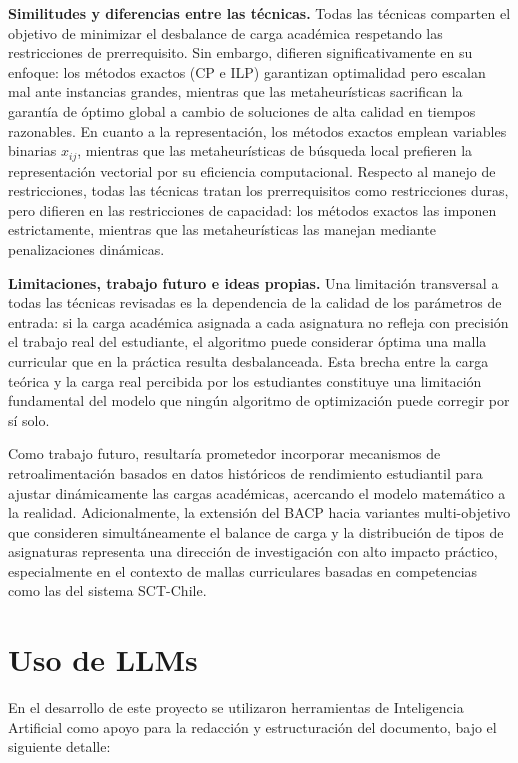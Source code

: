 \documentclass[letter, 10pt]{article}
\begin{document}
\textbf{Similitudes y diferencias entre las t\'ecnicas.} Todas las 
t\'ecnicas comparten el objetivo de minimizar el desbalance de carga 
acad\'emica respetando las restricciones de prerrequisito. Sin 
embargo, difieren significativamente en su enfoque: los m\'etodos 
exactos (CP e ILP) garantizan optimalidad pero escalan mal ante 
instancias grandes, mientras que las metaheur\'isticas sacrifican 
la garant\'ia de \'optimo global a cambio de soluciones de alta 
calidad en tiempos razonables. En cuanto a la representaci\'on, los 
m\'etodos exactos emplean variables binarias $x_{ij}$, mientras que 
las metaheur\'isticas de b\'usqueda local prefieren la representaci\'on 
vectorial por su eficiencia computacional. Respecto al manejo de 
restricciones, todas las t\'ecnicas tratan los prerrequisitos como 
restricciones duras, pero difieren en las restricciones de capacidad: 
los m\'etodos exactos las imponen estrictamente, mientras que las 
metaheur\'isticas las manejan mediante penalizaciones din\'amicas.

\textbf{Limitaciones, trabajo futuro e ideas propias.} Una limitaci\'on 
transversal a todas las t\'ecnicas revisadas es la dependencia de la 
calidad de los par\'ametros de entrada: si la carga acad\'emica 
asignada a cada asignatura no refleja con precisi\'on el trabajo real 
del estudiante, el algoritmo puede considerar \'optima una malla 
curricular que en la pr\'actica resulta desbalanceada. Esta brecha 
entre la carga te\'orica y la carga real percibida por los estudiantes 
constituye una limitaci\'on fundamental del modelo que ning\'un 
algoritmo de optimizaci\'on puede corregir por s\'i solo.

Como trabajo futuro, resultar\'ia prometedor incorporar mecanismos 
de retroalimentaci\'on basados en datos hist\'oricos de rendimiento 
estudiantil para ajustar din\'amicamente las cargas acad\'emicas, 
acercando el modelo matem\'atico a la realidad. Adicionalmente, la 
extensi\'on del BACP hacia variantes multi-objetivo que consideren 
simult\'aneamente el balance de carga y la distribuci\'on de tipos de 
asignaturas representa una direcci\'on de investigaci\'on con alto 
impacto pr\'actico, especialmente en el contexto de mallas 
curriculares basadas en competencias como las del sistema SCT-Chile.

\section{Uso de LLMs}
\noindent En el desarrollo de este proyecto se utilizaron herramientas de Inteligencia Artificial como apoyo para la redacci\'on y estructuraci\'on del documento, bajo el siguiente detalle:
\end{document}
